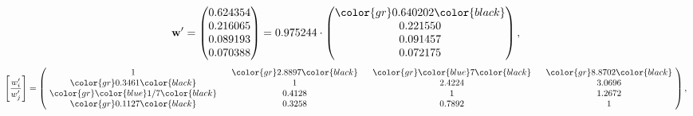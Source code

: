 \begin{example}
\begin{equation*}
\mathbf{w}^{\prime} =
\begin{pmatrix}
0.624354\\
0.216065\\
0.089193\\
0.070388
\end{pmatrix} =
0.975244\cdot
\begin{pmatrix}
\color{gr} 0.640202\color{black} \\
0.221550\\
0.091457\\
0.072175
\end{pmatrix},
\end{equation*}
\begin{equation*}
\left[ \frac{{w}^{\prime}_i}{{w}^{\prime}_j} \right] =
\begin{pmatrix}
$\,\,$ 1 $\,\,$ & $\,\,$\color{gr} 2.8897\color{black} $\,\,$ & $\,\,$\color{gr} \color{blue} 7\color{black} $\,\,$ & $\,\,$\color{gr} 8.8702\color{black} $\,\,$ \\
$\,\,$\color{gr} 0.3461\color{black} $\,\,$ & $\,\,$ 1 $\,\,$ & $\,\,$2.4224$\,\,$ & $\,\,$3.0696  $\,\,$ \\
$\,\,$\color{gr} \color{blue}  1/7\color{black} $\,\,$ & $\,\,$0.4128$\,\,$ & $\,\,$ 1 $\,\,$ & $\,\,$1.2672 $\,\,$ \\
$\,\,$\color{gr} 0.1127\color{black} $\,\,$ & $\,\,$0.3258$\,\,$ & $\,\,$0.7892$\,\,$ & $\,\,$ 1  $\,\,$ \\
\end{pmatrix},
\end{equation*}
\end{example}
\newpage
